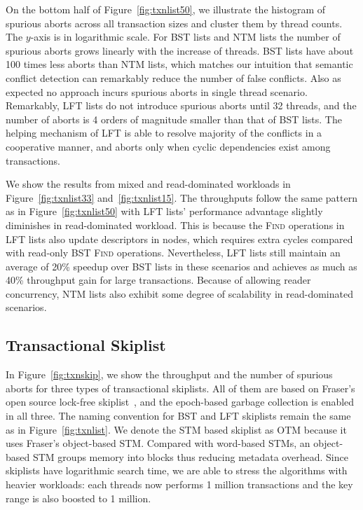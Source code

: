 \documentclass{sig-alternate-05-2015}
\begin{document}
On the bottom half of Figure~\ref{fig:txnlist50}, we illustrate the histogram of spurious aborts across all transaction sizes and cluster them by thread counts.
The $y$-axis is in logarithmic scale.
For BST lists and NTM lists the number of spurious aborts grows linearly with the increase of threads.
BST lists have about 100 times less aborts than NTM lists, which matches our intuition that semantic conflict detection can remarkably reduce the number of false conflicts.
Also as expected no approach incurs spurious aborts in single thread scenario.
Remarkably, LFT lists do not introduce spurious aborts until 32 threads, and the number of aborts is 4 orders of magnitude smaller than that of BST lists. 
The helping mechanism of LFT is able to resolve majority of the conflicts in a cooperative manner, and aborts only when cyclic dependencies exist among transactions.

We show the results from mixed and read-dominated workloads in Figure~\ref{fig:txnlist33} and~\ref{fig:txnlist15}. 
The throughputs follow the same pattern as in Figure~\ref{fig:txnlist50} with LFT lists' performance advantage slightly diminishes in read-dominated workload.
This is because the \textsc{Find} operations in LFT lists also update descriptors in nodes, which requires extra cycles compared with read-only BST \textsc{Find} operations.
Nevertheless, LFT lists still maintain an average of 20\% speedup over BST lists in these scenarios and achieves as much as 40\% throughput gain for large transactions.  
Because of allowing reader concurrency, NTM lists also exhibit some degree of scalability in read-dominated scenarios.

\subsection{Transactional Skiplist}
\label{sec:txnskiplistexp}
In Figure~\ref{fig:txnskip}, we show the throughput and the number of spurious aborts for three types of transactional skiplists.
All of them are based on Fraser's open source lock-free skiplist~\cite{fraser2004practical}, and the epoch-based garbage collection is enabled in all three. 
The naming convention for BST and LFT skiplists remain the same as in Figure~\ref{fig:txnlist}.
We denote the STM based skiplist as OTM because it uses Fraser's object-based STM.
Compared with word-based STMs, an object-based STM groups memory into blocks thus reducing metadata overhead.
Since skiplists have logarithmic search time, we are able to stress the algorithms with heavier workloads: each threads now performs 1 million transactions and the key range is also boosted to 1 million.
\end{document}
